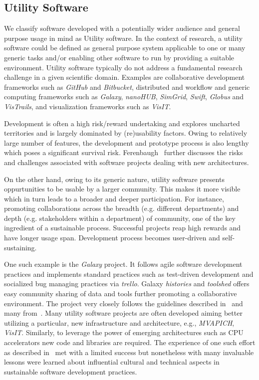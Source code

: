 \documentclass[11pt, oneside]{amsart}
\begin{document}
\subsection{Utility Software}

We classify software developed with a potentially wider audience and general
purpose usage in mind as Utility software. In the context of research, a
utility software could be defined as general purpose system applicable to one
or many generic tasks and/or enabling other software to run by providing a
suitable environment. Utility software typically do not address a fundamental
research challenge in a given scientific domain. Examples are collaborative
development frameworks such as \emph{GitHub} and \emph{Bitbucket}, distributed
and workflow and generic computing frameworks such as \emph{Galaxy},
\emph{nanoHUB}, \emph{SimGrid}, \emph{Swift}, \emph{Globus} and \emph{VisTrails}, and
visualization frameworks such as \emph{VisIT}. 

Development is often a high risk/reward undertaking and explores uncharted
territories and is largely dominated by (re)usability factors. Owing to
relatively large number of features, the development and prototype process is
also lengthy which poses a significant survival risk.
Ferenbaugh~\cite{Ferenbaugh_WSSSPE} further discusses the risks and challenges
associated with software projects dealing with new architectures.

On the other hand, owing to its generic nature, utility software presents
oppurtunities to be usable by a larger community. This makes it more visible
which in turn leads to a broader and deeper participation. For
instance, promoting collaborations across the breadth (e.g. different
departments) and depth (e.g. stakeholders within a department) of community,
one of the key ingredient of a sustainable process. Successful projects reap
high rewards and have longer usage span. Development process becomes
user-driven and self-sustaining.

One such example is the \emph{Galaxy} project. It follows agile software
development practices and implements standard practices such as test-driven
development and socialized bug managing practices via \emph{trello}. Galaxy
\emph{histories} and \emph{toolshed} offers easy community sharing of data and
tools further promoting a collaborative environment. The project very closely
follows the guidelines described in~\cite{Carver_WSSSPE} and many
from~\cite{Prlic_WSSSPE}. Many utility software projects are often developed
aiming better utilizing a particular, new infrastructure and architecture,
e.g., \emph{MVAPICH}, \emph{VisIT}. Similarly, to leverage the power of
emerging architectures such as CPU accelerators new code and libraries are
required. The experience of one such effort as described
in~\cite{Ferenbaugh_WSSSPE} met with a limited success but nonetheless with
many invaluable lessons were learned about influential cultural and technical
aspects in sustainable software development practices.
\end{document}
